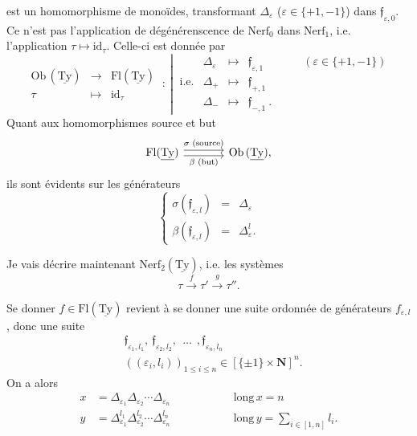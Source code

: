 \documentclass[11pt]{article}
\newcommand{\msp}[1]{\marginpar{\raggedright\footnotesize [#1]}}
\newcommand{\uTy}{\underline{\mathrm{Ty}}}
\begin{document}
est un homomorphisme de monoïdes, transformant $\Delta_\varepsilon$ ($\varepsilon\in\{+1,-1\}$) dans $\mathfrak{f}_{\varepsilon,0}$. Ce n'est pas l'application de dégénérenscence de $\mathrm{Nerf}_0$ dans $\mathrm{Nerf}_1$, i.e. l'application $\tau\longmapsto\mathrm{id}_\tau$. Celle-ci est donnée par %
\[
\begin{array}{ccc}
\mathrm{Ob}\,(\uTy) & \longrightarrow & \mathrm{Fl}(\uTy)\\[4pt]
\tau & \longmapsto & \mathrm{id}_\tau
\end{array}
\ :\
\left|\
\begin{array}{rcccl}
 & \Delta_\varepsilon & \longmapsto & \mathfrak{f}_{\varepsilon,1} & \qquad(\varepsilon\in\{+1,-1\})\\[4pt]
\text{i.e.} & \Delta_+ & \longmapsto & \mathfrak{f}_{+,1} & \\[4pt]
 & \Delta_- & \longmapsto & \mathfrak{f}_{-,1}\ . &
\end{array}
\right.
\]
Quant aux homomorphismes source et but
\[
\begin{tikzcd}[column sep=large]
\mathrm{Fl}(\uTy) \arrow[r, shift left, "\sigma\text{ (source)}"] \arrow[r, shift right, "\beta\text{ (but)}"'] & \mathrm{Ob}\,(\uTy),
\end{tikzcd}
\]
ils sont évidents sur les générateurs
\[
\left\{
\begin{array}{lcl}
\sigma(\mathfrak{f}_{\varepsilon,l}) & = & \Delta_\varepsilon\\[4pt]
\beta(\mathfrak{f}_{\varepsilon,l}) & = & \Delta^l_\varepsilon.
\end{array}
\right.
\]

Je vais décrire maintenant $\mathrm{Nerf}_2(\uTy)$, i.e. les systèmes
\[
\tau \xrightarrow{\ f\ } \tau' \xrightarrow{\ g\ } \tau''.
\]

\msp{page 52}
Se donner $f\in\mathrm{Fl}(\uTy)$ revient à se donner une suite ordonnée de générateurs $f_{\varepsilon,l}$, donc une suite
\[
\begin{aligned}
&\mathfrak{f}_{\varepsilon_1,l_1},\ \mathfrak{f}_{\varepsilon_2,l_2},\ \ \dots\ \ ,\mathfrak{f}_{\varepsilon_n,l_n}\\
&((\varepsilon_i,l_i))_{1\leq i\leq n}\in[\{\pm1\}\times\mathbf{N}]^n.
\end{aligned}
\]
On a alors
\[
\begin{aligned}
x &= \Delta_{\varepsilon_1}\Delta_{\varepsilon_2}\cdots\Delta_{\varepsilon_n} &\qquad\qquad& \mathrm{long}\,x = n\\
y &= \Delta^{l_1}_{\varepsilon_1}\Delta^{l_2}_{\varepsilon_2}\cdots\Delta^{l_n}_{\varepsilon_n} && \mathrm{long}\,y = \textstyle\sum_{i\in[1,n]} l_i.
\end{aligned}
\]
\end{document}
